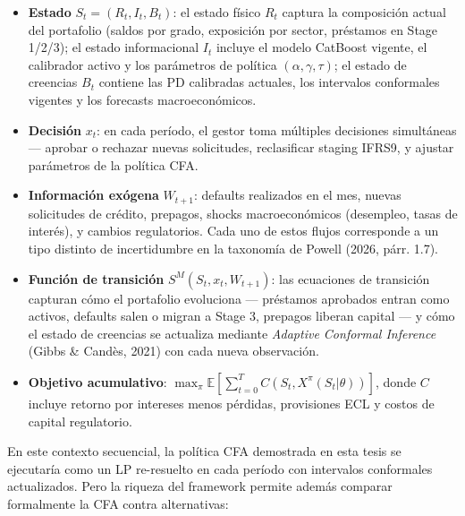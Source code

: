 \documentclass[
  spanish,
  11pt,
  letterpaper,
]{scrbook}
\providecommand{\tightlist}{%
  \setlength{\itemsep}{0pt}\setlength{\parskip}{0pt}}
\theoremstyle{plain}
\theoremstyle{remark}
\begin{document}
\begin{itemize}
\tightlist
\item
  \textbf{Estado} \(S_t = (R_t, I_t, B_t)\): el estado físico \(R_t\)
  captura la composición actual del portafolio (saldos por grado,
  exposición por sector, préstamos en Stage 1/2/3); el estado
  informacional \(I_t\) incluye el modelo CatBoost vigente, el
  calibrador activo y los parámetros de política
  \((\alpha, \gamma, \tau)\); el estado de creencias \(B_t\) contiene
  las PD calibradas actuales, los intervalos conformales vigentes y los
  forecasts macroeconómicos.
\item
  \textbf{Decisión} \(x_t\): en cada período, el gestor toma múltiples
  decisiones simultáneas --- aprobar o rechazar nuevas solicitudes,
  reclasificar staging IFRS9, y ajustar parámetros de la política CFA.
\item
  \textbf{Información exógena} \(W_{t+1}\): defaults realizados en el
  mes, nuevas solicitudes de crédito, prepagos, shocks macroeconómicos
  (desempleo, tasas de interés), y cambios regulatorios. Cada uno de
  estos flujos corresponde a un tipo distinto de incertidumbre en la
  taxonomía de Powell (2026, párr. 1.7).
\item
  \textbf{Función de transición} \(S^M(S_t, x_t, W_{t+1})\): las
  ecuaciones de transición capturan cómo el portafolio evoluciona ---
  préstamos aprobados entran como activos, defaults salen o migran a
  Stage 3, prepagos liberan capital --- y cómo el estado de creencias se
  actualiza mediante \emph{Adaptive Conformal Inference} (Gibbs \&
  Candès, 2021) con cada nueva observación.
\item
  \textbf{Objetivo acumulativo}:
  \(\max_\pi \mathbb{E}\!\left[\sum_{t=0}^{T} C(S_t, X^\pi(S_t|\theta))\right]\),
  donde \(C\) incluye retorno por intereses menos pérdidas, provisiones
  ECL y costos de capital regulatorio.
\end{itemize}

En este contexto secuencial, la política CFA demostrada en esta tesis se
ejecutaría como un LP re-resuelto en cada período con intervalos
conformales actualizados. Pero la riqueza del framework permite además
comparar formalmente la CFA contra alternativas:
\end{document}
